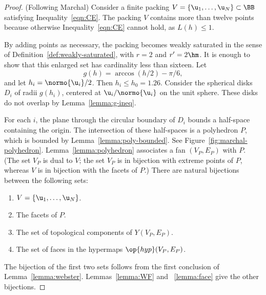\begin{proof} (Following Marchal) Consider a finite packing $
  V=\{\u_1,\ldots, \u_N\}\subset \BB$ satisfying
  Inequality~\ref{eqn:CE}.  The packing $V$ contains more than twelve
  points because otherwise Inequality~\ref{eqn:CE} cannot hold, as
  $L(h)\le 1$.

  By adding points as necessary, the packing becomes weakly saturated
  in the sense of Definition~\ref{def:weakly-saturated}, with $r=2$
  and $r'=2\hm$.  It is enough to show that this enlarged set has
  cardinality less than sixteen.  Let
\[ %
g(h) = \arccos(h/2) - \pi/6,  %
\] %
and let $h_i =
\normo{ \u_i}/2$.  Then $h_i\le h_0=1.26$.
Consider the spherical disks $D_i$ of radii $g(h_i)$,
centered at $ \u_i/\normo{ \u_i}$ on the unit sphere.  
These disks do not overlap by Lemma~\ref{lemma:g-ineq}.


%
For each $i$, the plane through the circular boundary of $D_i$ bounds
a half-space containing the origin.  The intersection of these
half-spaces is a polyhedron $P$, which is bounded by
Lemma~\ref{lemma:poly-bounded}.  See Figure~\ref{fig:marchal-polyhedron}. 
Lemma~\ref{lemma:polyhedron}
associates a fan $(V_P,E_P)$ with $P$.  (The set $V_P$ is dual to $
V$; the set $V_P$ is in bijection with extreme points of $P$, whereas
$ V$ is in bijection with the facets of $P$.)  There are natural
bijections between the following sets:
\begin{enumerate}\wasitemize  
\item $ V = \{ \u_1,\ldots, \u_N\}$.
\item The  facets of $P$.
\item The set of  topological components of $Y(V_P,E_P)$.
\item The set of faces in the hypermaps $\op{hyp}(V_P,E_P)$.
\end{enumerate}\wasitemize 
The bijection of the first two sets follows from the first conclusion
of Lemma~\ref{lemma:webster}.  Lemmas~\ref{lemma:WF} and
~\ref{lemma:face} give the other bijections.

\figZXEVDCA %


\end{proof}
